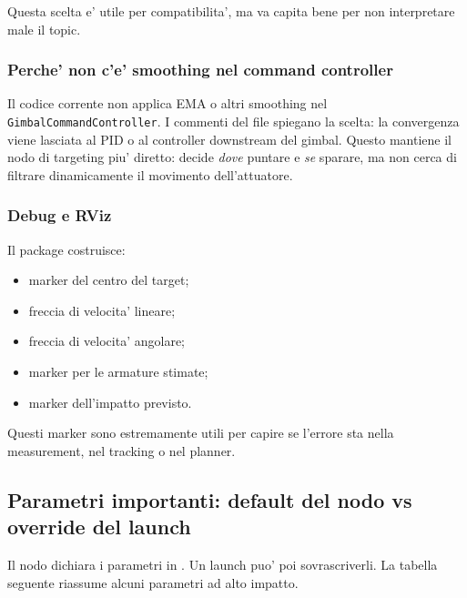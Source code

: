 \documentclass[11pt,a4paper]{article}
\newcommand{\code}[1]{\texttt{#1}}
\begin{document}
Questa scelta e' utile per compatibilita', ma va capita bene per non interpretare male il topic.

\subsubsection{Perche' non c'e' smoothing nel command controller}

Il codice corrente non applica EMA o altri smoothing nel \code{GimbalCommandController}. I commenti del file spiegano la scelta: la convergenza viene lasciata al PID o al controller downstream del gimbal. Questo mantiene il nodo di targeting piu' diretto: decide \emph{dove} puntare e \emph{se} sparare, ma non cerca di filtrare dinamicamente il movimento dell'attuatore.

\subsubsection{Debug e RViz}

Il package costruisce:
\begin{itemize}[leftmargin=1.4em]
  \item marker del centro del target;
  \item freccia di velocita' lineare;
  \item freccia di velocita' angolare;
  \item marker per le armature stimate;
  \item marker dell'impatto previsto.
\end{itemize}

Questi marker sono estremamente utili per capire se l'errore sta nella measurement, nel tracking o nel planner.

\subsection{Parametri importanti: default del nodo vs override del launch}

Il nodo dichiara i parametri in . Un launch puo' poi sovrascriverli. La tabella seguente riassume alcuni parametri ad alto impatto.
\end{document}
